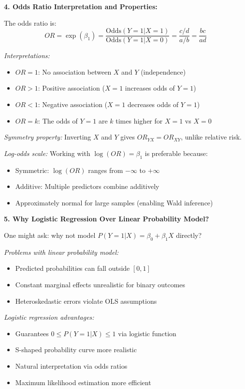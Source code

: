 \documentclass[12pt]{article}
\begin{document}
\begin{explanation}
\textbf{4. Odds Ratio Interpretation and Properties:}

The odds ratio is:
\[
OR = \exp(\beta_1) = \frac{\text{Odds}(Y=1|X=1)}{\text{Odds}(Y=1|X=0)} = \frac{c/d}{a/b} = \frac{bc}{ad}
\]

\textit{Interpretations:}
\begin{itemize}
\item $OR = 1$: No association between $X$ and $Y$ (independence)
\item $OR > 1$: Positive association ($X=1$ increases odds of $Y=1$)
\item $OR < 1$: Negative association ($X=1$ decreases odds of $Y=1$)
\item $OR = k$: The odds of $Y=1$ are $k$ times higher for $X=1$ vs $X=0$
\end{itemize}

\textit{Symmetry property:} Inverting $X$ and $Y$ gives $OR_{YX} = OR_{XY}$, unlike relative risk.

\textit{Log-odds scale:} Working with $\log(OR) = \beta_1$ is preferable because:
\begin{itemize}
\item Symmetric: $\log(OR)$ ranges from $-\infty$ to $+\infty$
\item Additive: Multiple predictors combine additively
\item Approximately normal for large samples (enabling Wald inference)
\end{itemize}

\textbf{5. Why Logistic Regression Over Linear Probability Model?}

One might ask: why not model $P(Y=1|X) = \beta_0 + \beta_1X$ directly?

\textit{Problems with linear probability model:}
\begin{itemize}
\item Predicted probabilities can fall outside $[0,1]$
\item Constant marginal effects unrealistic for binary outcomes
\item Heteroskedastic errors violate OLS assumptions
\end{itemize}

\textit{Logistic regression advantages:}
\begin{itemize}
\item Guarantees $0 \leq P(Y=1|X) \leq 1$ via logistic function
\item S-shaped probability curve more realistic
\item Natural interpretation via odds ratios
\item Maximum likelihood estimation more efficient
\end{itemize}


\end{explanation}
\end{document}
